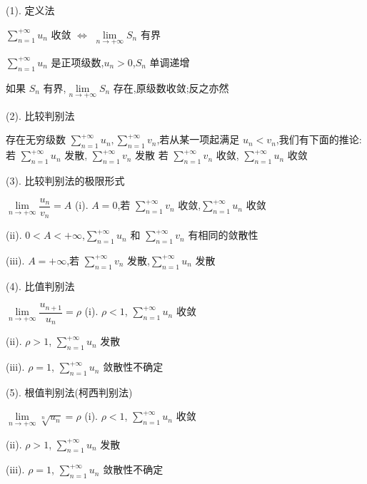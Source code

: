 (1). 定义法\label{定义法}
\begin{theorem}[收敛原则]\label{the: 正向级数敛散性的判别方法}
	$\sum\limits_{n=1}^{+\infty}u_{n}$ 收敛 $\Leftrightarrow$ $\lim\limits_{n\rightarrow +\infty}S_{n}$ 有界
\end{theorem}
\begin{anymark}[证明]
	$\sum\limits_{n=1}^{+\infty}u_{n}$ 是正项级数,$u_{n}>0$,$S_{n}$ 单调递增

	如果 $S_{n}$ 有界,$\lim\limits_{n\rightarrow+\infty}S_{n}$ 存在,原级数收敛;反之亦然
\end{anymark}
(2). 比较判别法
\begin{theorem}
	存在无穷级数 $\sum\limits_{n=1}^{+\infty}u_{n},\sum\limits_{n=1}^{+\infty}v_{n}$,若从某一项起满足 $u_{n}<v_{n}$,我们有下面的推论:
	若 $\sum\limits_{n=1}^{+\infty}u_{n}$ 发散, $\sum\limits_{n=1}^{+\infty}v_{n}$ 发散
	若 $\sum\limits_{n=1}^{+\infty}v_{n}$ 收敛, $\sum\limits_{n=1}^{+\infty}u_{n}$ 收敛
\end{theorem}
(3). 比较判别法的极限形式
\begin{theorem}\label{the: 比较判别法的极限形式}
	$\lim\limits_{n\rightarrow+\infty}\dfrac{u_{n}}{v_{n}}=A$
	(i). $A=0$,若 $\sum\limits_{n=1}^{+\infty}v_{n}$ 收敛,$\sum\limits_{n=1}^{+\infty}u_{n}$ 收敛

	(ii). $0<A<+\infty$,$\sum\limits_{n=1}^{+\infty}u_{n}$ 和 $\sum\limits_{n=1}^{+\infty}v_{n}$ 有相同的敛散性

	(iii). $A=+\infty$,若 $\sum\limits_{n=1}^{+\infty}v_{n}$ 发散,$\sum\limits_{n=1}^{+\infty}u_{n}$ 发散
\end{theorem}
(4). 比值判别法
\begin{theorem}
	$\lim\limits_{n\rightarrow+\infty}\dfrac{u_{n+1}}{u_{n}}=\rho$
	(i). $\rho<1$, $\sum\limits_{n=1}^{+\infty}u_{n}$ 收敛

	(ii). $\rho>1$, $\sum\limits_{n=1}^{+\infty}u_{n}$ 发散

	(iii). $\rho=1$, $\sum\limits_{n=1}^{+\infty}u_{n}$ 敛散性不确定
\end{theorem}
(5). 根值判别法(柯西判别法)
\begin{theorem}
	$\lim\limits_{n\rightarrow+\infty}\sqrt[n]{u_{n}}=\rho$
	(i). $\rho<1$, $\sum\limits_{n=1}^{+\infty}u_{n}$ 收敛

	(ii). $\rho>1$, $\sum\limits_{n=1}^{+\infty}u_{n}$ 发散

	(iii). $\rho=1$, $\sum\limits_{n=1}^{+\infty}u_{n}$ 敛散性不确定
\end{theorem}
